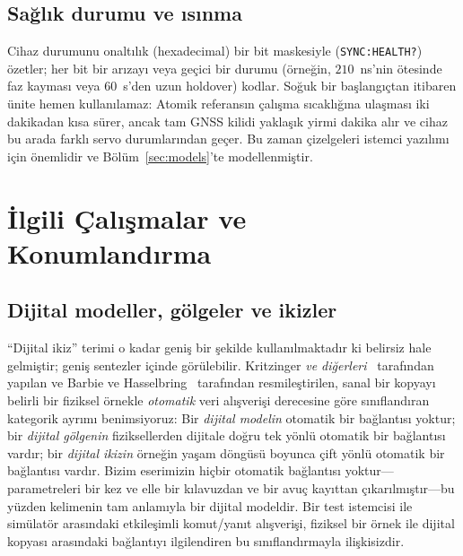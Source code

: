 \documentclass[9pt,twocolumn,a4paper]{extarticle}
\begin{document}
\subsection{Sağlık durumu ve ısınma}
Cihaz durumunu onaltılık (hexadecimal) bir bit maskesiyle (\texttt{SYNC:HEALTH?}) özetler; her bit bir arızayı veya geçici bir durumu (örneğin, $210$~ns'nin ötesinde faz kayması veya $60$~s'den uzun holdover) kodlar. Soğuk bir başlangıçtan itibaren ünite hemen kullanılamaz: Atomik referansın çalışma sıcaklığına ulaşması iki dakikadan kısa sürer, ancak tam GNSS kilidi yaklaşık yirmi dakika alır ve cihaz bu arada farklı servo durumlarından geçer. Bu zaman çizelgeleri istemci yazılımı için önemlidir ve Bölüm~\ref{sec:models}'te modellenmiştir.

\section{İlgili Çalışmalar ve Konumlandırma}
\label{sec:related}
\subsection{Dijital modeller, gölgeler ve ikizler}
``Dijital ikiz'' terimi o kadar geniş bir şekilde kullanılmaktadır ki belirsiz hale gelmiştir; geniş sentezler \cite{tao2019dt,rasheed2020dt} içinde görülebilir. Kritzinger \emph{ve diğerleri}~\cite{kritzinger2018dt} tarafından yapılan ve Barbie ve Hasselbring~\cite{barbie2024dtp} tarafından resmileştirilen, sanal bir kopyayı belirli bir fiziksel örnekle \emph{otomatik} veri alışverişi derecesine göre sınıflandıran kategorik ayrımı benimsiyoruz: Bir \emph{dijital modelin} otomatik bir bağlantısı yoktur; bir \emph{dijital gölgenin} fiziksellerden dijitale doğru tek yönlü otomatik bir bağlantısı vardır; bir \emph{dijital ikizin} örneğin yaşam döngüsü boyunca çift yönlü otomatik bir bağlantısı vardır. Bizim eserimizin hiçbir otomatik bağlantısı yoktur---parametreleri bir kez ve elle bir kılavuzdan ve bir avuç kayıttan çıkarılmıştır---bu yüzden kelimenin tam anlamıyla bir dijital modeldir. Bir test istemcisi ile simülatör arasındaki etkileşimli komut/yanıt alışverişi, fiziksel bir örnek ile dijital kopyası arasındaki bağlantıyı ilgilendiren bu sınıflandırmayla ilişkisizdir.
\end{document}
